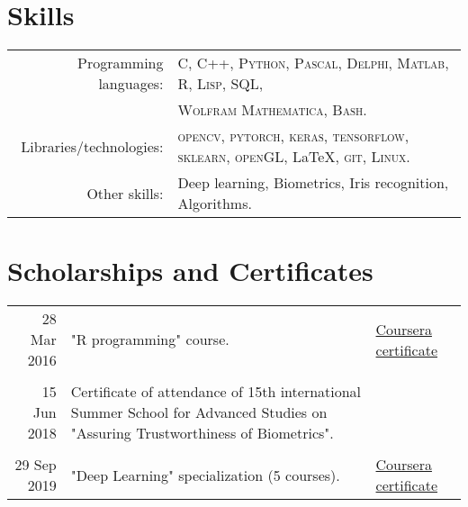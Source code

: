\documentclass[a4paper,10pt]{article}
\begin{document}
\section{Skills}
\begin{tabular}{rl}
 Programming languages: & \textsc{C}, \textsc{C++}, \textsc{Python}, \textsc{Pascal}, \textsc{Delphi}, \textsc{Matlab}, \textsc{R}, \textsc{Lisp}, \textsc{SQL}, \\
                        & \textsc{Wolfram Mathematica}, \textsc{Bash}.\\
Libraries/technologies: & \textsc{opencv}, \textsc{pytorch}, \textsc{keras}, \textsc{tensorflow}, \textsc{sklearn}, \textsc{openGL}, \LaTeX, \textsc{git}, \textsc{Linux}.\\
Other skills: & Deep learning, Biometrics, Iris recognition, Algorithms.
\end{tabular}

\section{Scholarships and Certificates}
\begin{tabular}{r|p{8cm}l}
28 Mar 2016 & "R programming" course. & \href{https://www.coursera.org/account/accomplishments/certificate/WCGWD43MCTN2}{Coursera certificate}\\
\\
15 Jun 2018 & Certificate of attendance of 15th international Summer School for Advanced Studies on "Assuring Trustworthiness of Biometrics". & \\
\\

29 Sep 2019 & "Deep Learning" specialization (5 courses). & \href{https://www.coursera.org/account/accomplishments/specialization/JUG4WWN9PTD9}{Coursera certificate}
\end{tabular}
\end{document}

